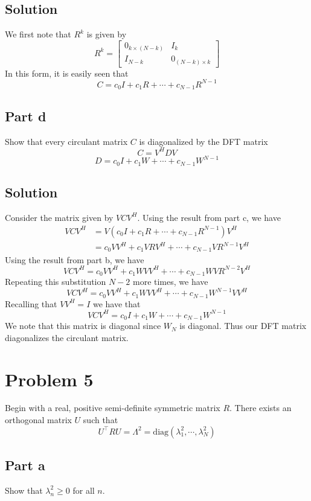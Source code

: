 \documentclass[a4paper]{article}
\begin{document}
\subsection*{Solution}%
We first note that $R^k$ is given by
\[
  R^k = 
  \begin{bmatrix}
    0_{k \times (N-k)}  & I_{k} \\
    I_{N-k} & 0_{(N-k) \times k}

  \end{bmatrix}
\]
In this form, it is easily seen that 
\[
  C = c_0I + c_1R + \cdots + c_{N-1}R^{N-1}
\]

\subsection*{Part d}%
Show that every circulant matrix $C$ is diagonalized by the DFT matrix
\[
  C = V^HDV
\]
\[
  D = c_0I + c_1W + \cdots + c_{N-1}W^{N-1}
\]

\subsection*{Solution}%
Consider the matrix given by $VCV^H$. Using the result from part c, we have
\[
  \begin{aligned}
    VCV^H &= V(c_0I + c_1 R + \cdots + c_{N-1}R^{N-1})V^H\\
          &= c_0VV^H + c_1 VRV^H + \cdots + c_{N-1}VR^{N-1}V^H
  \end{aligned}
\]
Using the result from part b, we have
\[
  VCV^H = c_0VV^H + c_1 WVV^H + \cdots + c_{N-1}WVR^{N-2}V^H
\]
Repeating this substitution $N-2$ more times, we have
\[
  VCV^H = c_0VV^H + c_1 WVV^H + \cdots + c_{N-1}W^{N-1}VV^H
\]
Recalling that $VV^H = I$ we have that
\[
  VCV^H = c_0I + c_1W + \cdots + c_{N-1}W^{N-1}
\]
We note that this matrix is diagonal since $W_N$ is diagonal. Thus our DFT matrix diagonalizes the circulant matrix.

\section*{Problem 5}%
Begin with a real,  positive semi-definite symmetric matrix $R$. There exists an orthogonal matrix $U$ such that
\[
  U^\top R U = \Lambda^2 = \text{diag}(\lambda_1^2, \cdots, \lambda_N^2)
\]

\subsection*{Part a}%
Show that $\lambda_n^2 \geq 0$ for all $n$.
\end{document}
